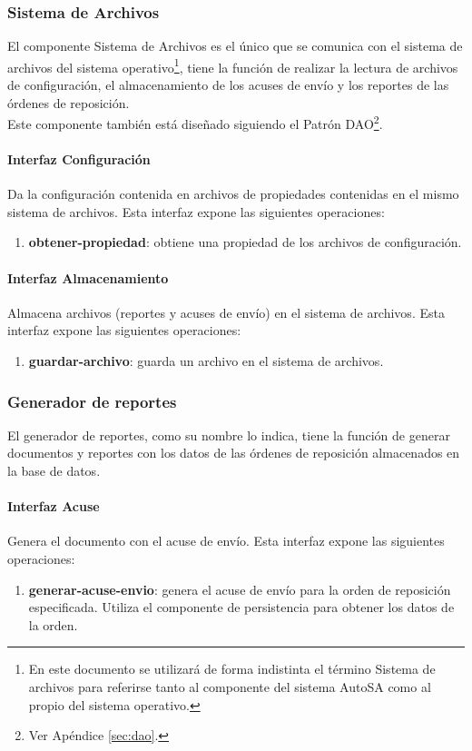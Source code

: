 \subsubsection{Sistema de Archivos}
El componente Sistema de Archivos es el único que se comunica con el sistema de archivos del sistema operativo\footnote{En este documento se utilizará de forma indistinta el término Sistema de archivos para referirse tanto al componente del sistema AutoSA como al propio del sistema operativo.}, tiene la función de realizar la lectura de archivos de configuración, el almacenamiento de los acuses de envío  y los reportes de las órdenes de reposición.\\
Este componente también está diseñado siguiendo el Patrón DAO\footnote{Ver Apéndice \ref{sec:dao}.}.
\paragraph{\indent Interfaz Configuración\\}
Da la configuración contenida en archivos de propiedades contenidas en el mismo sistema de archivos. Esta interfaz expone las siguientes operaciones:

\begin{enumerate}
	\item \textbf{obtener-propiedad}: obtiene una propiedad de los archivos de configuración.
\end{enumerate}

\paragraph{\indent Interfaz Almacenamiento\\}
Almacena archivos (reportes y acuses de envío) en el sistema de archivos. Esta interfaz expone las siguientes operaciones:
\begin{enumerate}
	\item \textbf{guardar-archivo}: guarda un archivo en el sistema de archivos.
\end{enumerate}

\subsubsection{Generador de reportes}
El generador de reportes, como su nombre lo indica, tiene la función de generar documentos y reportes con los datos de las órdenes de reposición almacenados en la base de datos. 
\paragraph{\indent Interfaz Acuse\\} Genera el documento con el acuse de envío. Esta interfaz expone las siguientes operaciones:
\begin{enumerate}
	\item \textbf{generar-acuse-envio}: genera el acuse de envío para la orden de reposición especificada. Utiliza el componente de persistencia para obtener los datos de la orden.
\end{enumerate}

